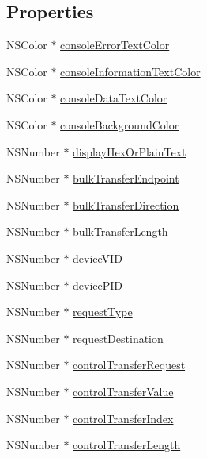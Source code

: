 \subsection*{Properties}
\begin{DoxyCompactItemize}
\item 
N\-S\-Color $\ast$ \hyperlink{interface_c_t_app_delegate_ab0bb80237b8aa297ec48dec224eddbb7}{console\-Error\-Text\-Color}
\item 
N\-S\-Color $\ast$ \hyperlink{interface_c_t_app_delegate_a5b184ad30f043f8eb642ef9f21f11555}{console\-Information\-Text\-Color}
\item 
N\-S\-Color $\ast$ \hyperlink{interface_c_t_app_delegate_a51aebba711d81a108659db7f5a2e3509}{console\-Data\-Text\-Color}
\item 
N\-S\-Color $\ast$ \hyperlink{interface_c_t_app_delegate_a9fc48b94e012554988d71fab9fc854b8}{console\-Background\-Color}
\item 
N\-S\-Number $\ast$ \hyperlink{interface_c_t_app_delegate_a4578b9f0c04d7376bde881085bad233a}{display\-Hex\-Or\-Plain\-Text}
\item 
N\-S\-Number $\ast$ \hyperlink{interface_c_t_app_delegate_ae808b0548069c03cc1912db1c83891eb}{bulk\-Transfer\-Endpoint}
\item 
N\-S\-Number $\ast$ \hyperlink{interface_c_t_app_delegate_adea2205a53bdecd999d70b5abd08696f}{bulk\-Transfer\-Direction}
\item 
N\-S\-Number $\ast$ \hyperlink{interface_c_t_app_delegate_ac4efbc9d53180254895b9733fe3d376e}{bulk\-Transfer\-Length}
\item 
N\-S\-Number $\ast$ \hyperlink{interface_c_t_app_delegate_ac3f78415dd122de7cebf7a3745a69da9}{device\-V\-I\-D}
\item 
N\-S\-Number $\ast$ \hyperlink{interface_c_t_app_delegate_a5803369bf1901ee34be36dbdd3eb3734}{device\-P\-I\-D}
\item 
N\-S\-Number $\ast$ \hyperlink{interface_c_t_app_delegate_ae0366c6888903dc8247ecf1f2dacc69d}{request\-Type}
\item 
N\-S\-Number $\ast$ \hyperlink{interface_c_t_app_delegate_a91630675dd1cdd1844fdd217ce52bf86}{request\-Destination}
\item 
N\-S\-Number $\ast$ \hyperlink{interface_c_t_app_delegate_aade0217b509c082080b919e7a9f55046}{control\-Transfer\-Request}
\item 
N\-S\-Number $\ast$ \hyperlink{interface_c_t_app_delegate_a62fe8f350142e22ead502a51f201cb1f}{control\-Transfer\-Value}
\item 
N\-S\-Number $\ast$ \hyperlink{interface_c_t_app_delegate_af08e59f3a506606bfa91e079b9ae16a6}{control\-Transfer\-Index}
\item 
N\-S\-Number $\ast$ \hyperlink{interface_c_t_app_delegate_afb1667e9e2db3e2b289a099508a338d5}{control\-Transfer\-Length}
\end{DoxyCompactItemize}


